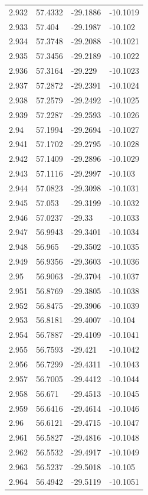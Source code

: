 \begin{tabular}{llll}
2.932 & 57.4332 & -29.1886 & -10.1019 \\
2.933 & 57.404 & -29.1987 & -10.102 \\
2.934 & 57.3748 & -29.2088 & -10.1021 \\
2.935 & 57.3456 & -29.2189 & -10.1022 \\
2.936 & 57.3164 & -29.229 & -10.1023 \\
2.937 & 57.2872 & -29.2391 & -10.1024 \\
2.938 & 57.2579 & -29.2492 & -10.1025 \\
2.939 & 57.2287 & -29.2593 & -10.1026 \\
2.94 & 57.1994 & -29.2694 & -10.1027 \\
2.941 & 57.1702 & -29.2795 & -10.1028 \\
2.942 & 57.1409 & -29.2896 & -10.1029 \\
2.943 & 57.1116 & -29.2997 & -10.103 \\
2.944 & 57.0823 & -29.3098 & -10.1031 \\
2.945 & 57.053 & -29.3199 & -10.1032 \\
2.946 & 57.0237 & -29.33 & -10.1033 \\
2.947 & 56.9943 & -29.3401 & -10.1034 \\
2.948 & 56.965 & -29.3502 & -10.1035 \\
2.949 & 56.9356 & -29.3603 & -10.1036 \\
2.95 & 56.9063 & -29.3704 & -10.1037 \\
2.951 & 56.8769 & -29.3805 & -10.1038 \\
2.952 & 56.8475 & -29.3906 & -10.1039 \\
2.953 & 56.8181 & -29.4007 & -10.104 \\
2.954 & 56.7887 & -29.4109 & -10.1041 \\
2.955 & 56.7593 & -29.421 & -10.1042 \\
2.956 & 56.7299 & -29.4311 & -10.1043 \\
2.957 & 56.7005 & -29.4412 & -10.1044 \\
2.958 & 56.671 & -29.4513 & -10.1045 \\
2.959 & 56.6416 & -29.4614 & -10.1046 \\
2.96 & 56.6121 & -29.4715 & -10.1047 \\
2.961 & 56.5827 & -29.4816 & -10.1048 \\
2.962 & 56.5532 & -29.4917 & -10.1049 \\
2.963 & 56.5237 & -29.5018 & -10.105 \\
2.964 & 56.4942 & -29.5119 & -10.1051 \\

\end{tabular}

